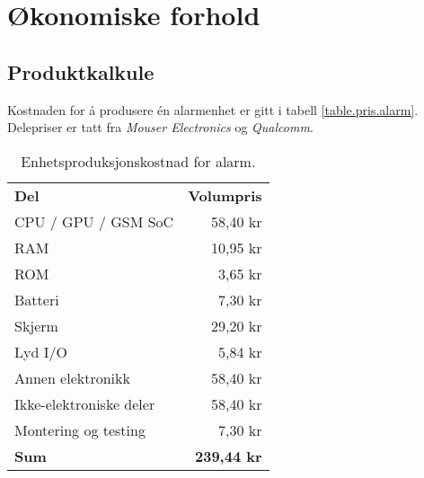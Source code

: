 



\clearpage
\section{Økonomiske forhold}

\subsection{Produktkalkule}

Kostnaden for å produsere én alarmenhet er gitt i tabell
\vref{table.pris.alarm}.  Delepriser er tatt fra \textit{Mouser Electronics} og
\textit{Qualcomm}.

\begin{table}
  \centering
  \begin{tabular}{lr}
    \textbf{Del} & \textbf{Volumpris} \\
    CPU / GPU / GSM SoC & 58,40 kr \\
    RAM       & 10,95 kr \\
    ROM       &  3,65 kr \\
    Batteri   &  7,30 kr \\
    Skjerm    & 29,20 kr \\
    Lyd I/O   &  5,84 kr \\
    Annen elektronikk & 58,40 kr \\
    Ikke-elektroniske deler & 58,40 kr \\
    Montering og testing & 7,30 kr \\
    \textbf{Sum} & \textbf{239,44 kr} \\
  \end{tabular}
  \caption{Enhetsproduksjonskostnad for alarm.}
  \label{table.pris.alarm}
\end{table}

